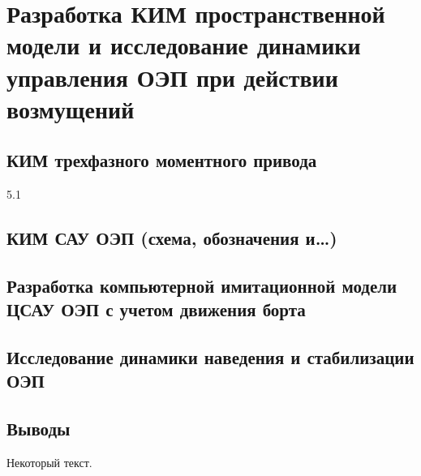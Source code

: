 \chapter{Разработка КИМ пространственной модели и исследование динамики управления ОЭП при действии возмущений} \label{ch:ch5}

\section{КИМ трехфазного моментного привода} \label{ch:ch5/sect1}

5.1  
\section{КИМ САУ ОЭП (схема, обозначения и…) } \label{ch:ch5/sect2}

\section{Разработка компьютерной имитационной модели ЦСАУ ОЭП с учетом  движения борта} \label{ch:ch5/sect3}

\section{Исследование динамики наведения и стабилизации ОЭП} \label{ch:ch5/sect4}

\section{Выводы} \label{ch:ch5/sect5}
	


Некоторый текст.

\clearpage